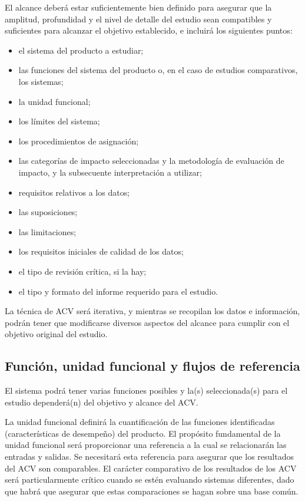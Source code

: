 El alcance deberá estar suficientemente bien definido para asegurar que la amplitud, profundidad y el nivel de detalle del estudio sean compatibles y suficientes para alcanzar el objetivo establecido, e incluirá los siguientes puntos:
\begin{itemize}
  \item el sistema del producto a estudiar;
  \item las funciones del sistema del producto o, en el caso de estudios comparativos, los sistemas;
  \item la unidad funcional;
  \item los límites del sistema;
  \item los procedimientos de asignación;
  \item las categorías de impacto seleccionadas y la metodología de evaluación de impacto, y la subsecuente interpretación a utilizar;
  \item requisitos relativos a los datos;
  \item las suposiciones;
  \item las limitaciones;
  \item los requisitos iniciales de calidad de los datos;
  \item el tipo de revisión crítica, si la hay;
  \item el tipo y formato del informe requerido para el estudio.
\end{itemize}

La técnica de ACV será iterativa, y mientras se recopilan los datos e información, podrán tener que modificarse diversos
aspectos del alcance para cumplir con el objetivo original del estudio.

\subsection{Función, unidad funcional y flujos de referencia}

El sistema podrá tener varias funciones posibles y la(s) seleccionada(s) para el estudio dependerá(n) del objetivo y alcance del ACV.

La unidad funcional definirá la cuantificación de las funciones identificadas (características de desempeño) del producto. El propósito fundamental de la unidad funcional será proporcionar una referencia a la cual se relacionarán las entradas y salidas. Se necesitará esta referencia para asegurar que los resultados del ACV son comparables. El carácter comparativo de los resultados de los ACV será particularmente crítico cuando se estén evaluando sistemas diferentes, dado que habrá que asegurar que estas comparaciones se hagan sobre una base común.

